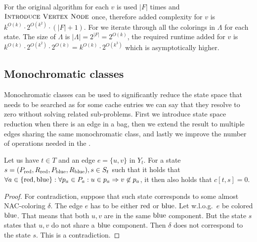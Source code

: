 For the original algorithm for each \( v \)
\IntroduceEdgeNode{} is used \( |F| \) times
and \( \textsc{Introduce Vertex Node}{} \) once, therefore added complexity for \( v \)
is \( {k}^{O(k)} \cdot 2^{O(k^2)} \cdot (|F| + 1) \).
%
For \IntroduceVertexWithEdgesNode{} we iterate
through all the colorings in \( \Lambda \) for each state.
The size of \( \Lambda \) is \( |\Lambda| = 2^{|F|} = 2^{O(k)} \),
the required runtime added for \( v \) is
\( {k}^{O(k)} \cdot 2^{O(k^2)} \cdot 2^{O(k)} = {k}^{O(k)} \cdot 2^{O(k^3)}\)
which is asymptotically higher.



\subsection{Monochromatic classes}

Monochromatic classes can be used to significantly reduce the state space
that needs to be searched as for some cache entries we can say that
they resolve to zero without solving related sub-problems.
%
First we introduce state space reduction when
there is an edge in a bag, then we extend the result to multiple edges
sharing the same monochromatic class, and lastly we improve the number of
operations needed in the \IntroduceVertexWithEdgesNode{}.
%
\begin{lemma}
	Let us have \( t \in T \) and an edge \( e = \{u, v\} \) in \( Y_t \).
	For a state \( s = (P_{\text{red}}, R_{\text{red}}, P_{\text{blue}}, R_{\text{blue}}), s \in S_t \)
	such that it holds that
	\( {\forall a \in \{\text{red}, \text{blue}\}} : {\forall p_a \in P_a} : {u \in p_a \Rightarrow v \not\in p_a} \),
	it then also holds that \( c[t, s] = 0 \).
\end{lemma}
%
%
\begin{proof}
	For contradiction, suppose that such state corresponds
	to some almost NAC-coloring \( \delta \).
	The edge \( e \) has to be either \( \text{red} \) or \( \text{blue} \).
	Let w.l.o.g.\ \( e \) be colored \( \text{blue} \).
	That means that both \( u, v \) are in the same \( \text{blue} \) component.
	But the state \( s \) states that \( u, v \) do not share a \( \text{blue} \) component.
	Then \( \delta \) does not correspond to the state \( s \).
	This is a contradiction.
\end{proof}
%

